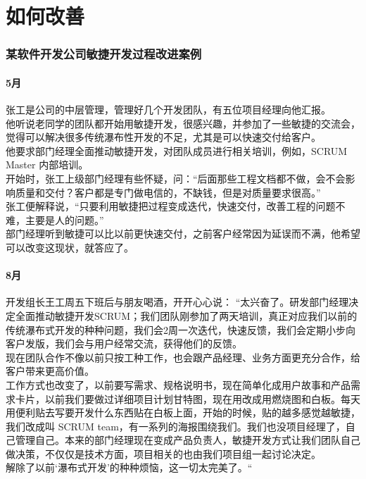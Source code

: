 \chapter{如何改善} %

\hypertarget{ux67d0ux8f6fux4ef6ux5f00ux53d1ux516cux53f8ux654fux6377ux5f00ux53d1ux8fc7ux7a0bux6539ux8fdbux6848ux4f8b}{%
\subsection{某软件开发公司敏捷开发过程改进案例}\label{ux67d0ux8f6fux4ef6ux5f00ux53d1ux516cux53f8ux654fux6377ux5f00ux53d1ux8fc7ux7a0bux6539ux8fdbux6848ux4f8b}}

\hypertarget{ux6708}{%
\subsubsection{5月}\label{ux6708}}

张工是公司的中层管理，管理好几个开发团队，有五位项目经理向他汇报。\\
他听说老同学的团队都开始用敏捷开发，很感兴趣，并参加了一些敏捷的交流会，觉得可以解决很多传统瀑布性开发的不足，尤其是可以快速交付给客户。\\
他要求部门经理全面推动敏捷开发，对团队成员进行相关培训，例如，SCRUM
Master 内部培训。\\
开始时，张工上级部门经理有些怀疑，问：``后面那些工程文档都不做，会不会影响质量和交付？客户都是专门做电信的，不缺钱，但是对质量要求很高。''\\
张工便解释说，``只要利用敏捷把过程变成迭代，快速交付，改善工程的问题不难，主要是人的问题。''\\
部门经理听到敏捷可以比以前更快速交付，之前客户经常因为延误而不满，他希望可以改变这现状，就答应了。

\hypertarget{ux6708-1}{%
\subsubsection{8月}\label{ux6708-1}}

开发组长王工周五下班后与朋友喝酒，开开心心说：
``太兴奋了。研发部门经理决定全面推动敏捷开发SCRUM；我们团队刚参加了两天培训，真正对应我们以前的传统瀑布式开发的种种问题，我们会2周一次迭代，快速反馈，我们会定期小步向客户发版，我们会与用户经常交流，获得他们的反馈。\\
现在团队合作不像以前只按工种工作，也会跟产品经理、业务方面更充分合作，给客户带来更高价值。\\
工作方式也改变了，以前要写需求、规格说明书，现在简单化成用户故事和产品需求卡片，以前我们要做过详细项目计划甘特图，现在用改成用燃烧图和白板。每天用便利贴去写要开发什么东西贴在白板上面，开始的时候，贴的越多感觉越敏捷，我们改成叫
SCRUM
team，有一系列的海报围绕我们。我们也没项目经理了，自己管理自己。本来的部门经理现在变成产品负责人，敏捷开发方式让我们团队自己做决策，不仅仅是技术方面，项目相关的也由我们项目组一起讨论决定。\\
解除了以前`瀑布式开发'的种种烦恼，这一切太完美了。``\\

